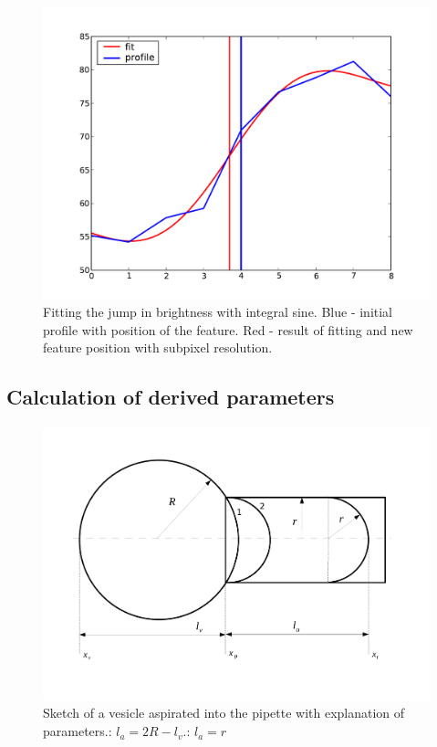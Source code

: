 \documentclass[a4paper,12pt]{article}
\begin{document}
\begin{figure}%
\includegraphics[width=\columnwidth]{figs/fitedge.pdf}%
\caption{Fitting the jump in brightness with integral sine. Blue - initial profile with position of the feature. Red - result of fitting and new feature position with subpixel resolution.}%
\label{fig:fitedge}%
\end{figure}

\subsection{Calculation of derived parameters}\label{results}

\begin{figure}%
\includegraphics[width=\columnwidth]{figs/pipettesketch.pdf}%
\caption{Sketch of a vesicle aspirated into the pipette with explanation of parameters.: $l_a = 2R-l_v$.: $l_a = r$}%
\label{fig:pipettesketch}%
\end{figure}
\end{document}
